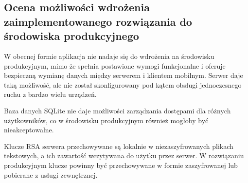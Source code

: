 \documentclass[../main.tex]{subfiles}
\begin{document}
\subsection{Ocena możliwości wdrożenia zaimplementowanego rozwiązania do środowiska produkcyjnego}

W obecnej formie aplikacja nie nadaje się do wdrożenia na środowisku produkcyjnym, mimo że spełnia postawione wymogi funkcjonalne i oferuje bezpieczną wymianę danych między serwerem i klientem mobilnym. Serwer daje taką możliwość, ale nie został skonfigurowany pod kątem obsługi jednoczesnego ruchu z bardzo wielu urządzeń.

Baza danych SQLite nie daje możliwości zarządzania dostępami dla różnych użytkowników, co w środowisku produkcyjnym również mogłoby być nieakceptowalne.

Klucze RSA serwera przechowywane są lokalnie w niezaszyfrowanych plikach tekstowych, a ich zawartość wczytywana do użytku przez serwer. W rozwiązaniu produkcyjnym klucze powinny być przechowywane w formie zaszyfrowanej lub pobierane z usługi zewnętrznej.
\end{document}
